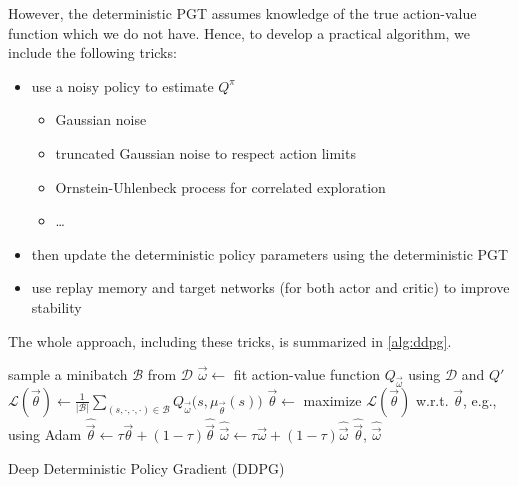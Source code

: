 			However, the deterministic \ac{PGT} assumes knowledge of the true action-value function which we do not have. Hence, to develop a practical algorithm, we include the following tricks:
			\begin{itemize}
				\item use a noisy policy to estimate \(Q^\pi\)
					\begin{itemize}
						\item Gaussian noise
						\item truncated Gaussian noise to respect action limits
						\item Ornstein-Uhlenbeck process for correlated exploration
						\item \dots
					\end{itemize}
				\item then update the deterministic policy parameters using the deterministic \ac{PGT}
				\item use replay memory and target networks (for both actor and critic) to improve stability
			\end{itemize}
			The whole approach, including these tricks, is summarized in \autoref{alg:ddpg}.

			\begin{algorithm}  \DontPrintSemicolon
				sample a minibatch \(\mathcal{B}\) from \(\mathcal{D}\) \;
				\( \vec{\omega} \gets \) fit action-value function \(Q_{\vec{\omega}}\) using \(\mathcal{D}\) and \(Q'\) \;
				\( \mathcal{L}(\vec{\theta}) \gets \frac{1}{\lvert \mathcal{B} \rvert} \sum_{(s, \cdot, \cdot, \cdot) \in \mathcal{B}} Q_{\vec{\omega}}\bigl( s, \mu_{\vec{\theta}}(s) \bigr) \) \;
				\( \vec{\theta} \gets \) maximize \(\mathcal{L}(\vec{\theta})\) w.r.t. \(\vec{\theta}\), e.g., using Adam \;
				\( \hat{\vec{\theta}} \gets \tau \vec{\theta} + (1 - \tau) \hat{\vec{\theta}} \) \;
				\( \hat{\vec{\omega}} \gets \tau \vec{\omega} + (1 - \tau) \hat{\vec{\omega}} \) \;
				\Return \(\hat{\vec{\theta}}\), \(\hat{\vec{\omega}}\) \;
				\caption{Deep Deterministic Policy Gradient (\acs{DDPG})}
				\label{alg:ddpg}
			\end{algorithm}

